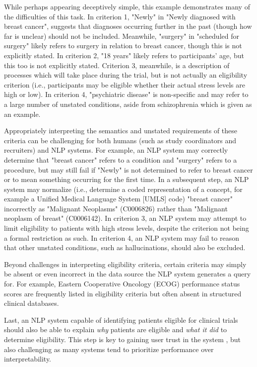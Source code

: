 \documentclass[../main.tex]{subfiles}
\begin{document}
\noindent While perhaps appearing deceptively simple, this example demonstrates many of the difficulties of this task. In criterion 1,  "Newly" in "Newly diagnosed with breast cancer", suggests that diagnoses occurring further in the past (though how far is unclear) should not be included. Meanwhile, "surgery" in "scheduled for surgery" likely refers to surgery in relation to breast cancer, though this is not explicitly stated. In criterion 2, "18 years" likely refers to participants' age, but this too is not explicitly stated. Criterion 3, meanwhile, is a description of processes which will take place during the trial, but is not actually an eligibility criterion (i.e., participants may be eligible whether their actual stress levels are high or low). In criterion 4, "psychiatric disease" is non-specific and may refer to a large number of unstated conditions, aside from schizophrenia which is given as an example.

Appropriately interpreting the semantics and unstated requirements of these criteria can be challenging for both humans (such as study coordinators and recruiters) and NLP systems. For example, an NLP system may correctly determine that "breast cancer" refers to a condition and "surgery" refers to a procedure, but may still fail if "Newly" is not determined to refer to breast cancer or to mean something occurring for the first time. In a subsequent step, an NLP system may normalize (i.e., determine a coded representation of a concept, for example a Unified Medical Language System [UMLS] code) "breast cancer" incorrectly as "Malignant Neoplasms" (C0006826) rather than "Malignant neoplasm of breast" (C0006142). In criterion 3, an NLP system may attempt to limit eligibility to patients with high stress levels, despite the criterion not being a formal restriction as such. In criterion 4, an NLP system may fail to reason that other unstated conditions, such as hallucinations, should also be excluded.

Beyond challenges in interpreting eligibility criteria, certain criteria may simply be absent or even incorrect in the data source the NLP system generates a query for. For example, Eastern Cooperative Oncology (ECOG) performance status scores \cite{sok2019objective} are frequently listed in eligibility criteria but often absent in structured clinical databases.

Last, an NLP system capable of identifying patients eligible for clinical trials should also be able to explain \textit{why} patients are eligible and \textit{what it did} to determine eligibility. This step is key to gaining user trust in the system \cite{lundberg2018explainable, jermutus2022influences}, but also challenging as many systems tend to prioritize performance over interpretability.
\end{document}
